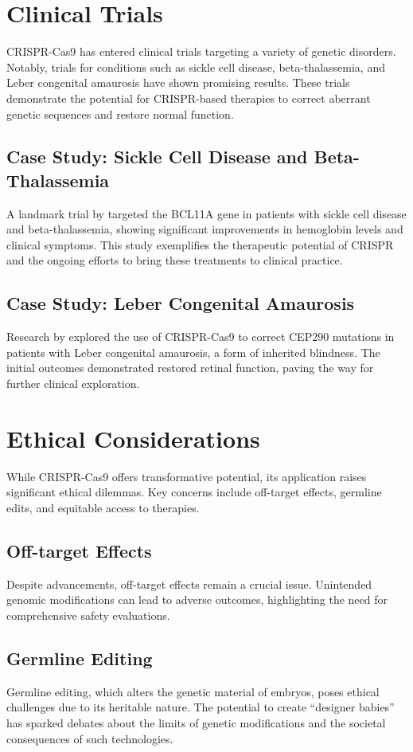 \documentclass[12pt]{article}
\begin{document}
\section{Clinical Trials}
CRISPR-Cas9 has entered clinical trials targeting a variety of genetic disorders. Notably, trials for conditions such as sickle cell disease, beta-thalassemia, and Leber congenital amaurosis have shown promising results. These trials demonstrate the potential for CRISPR-based therapies to correct aberrant genetic sequences and restore normal function.

\subsection{Case Study: Sickle Cell Disease and Beta-Thalassemia}
A landmark trial by \cite{frangoul2021} targeted the BCL11A gene in patients with sickle cell disease and beta-thalassemia, showing significant improvements in hemoglobin levels and clinical symptoms. This study exemplifies the therapeutic potential of CRISPR and the ongoing efforts to bring these treatments to clinical practice.

\subsection{Case Study: Leber Congenital Amaurosis}
Research by \cite{editas2021} explored the use of CRISPR-Cas9 to correct CEP290 mutations in patients with Leber congenital amaurosis, a form of inherited blindness. The initial outcomes demonstrated restored retinal function, paving the way for further clinical exploration.

\section{Ethical Considerations}
While CRISPR-Cas9 offers transformative potential, its application raises significant ethical dilemmas. Key concerns include off-target effects, germline edits, and equitable access to therapies.

\subsection{Off-target Effects}
Despite advancements, off-target effects remain a crucial issue. Unintended genomic modifications can lead to adverse outcomes, highlighting the need for comprehensive safety evaluations.

\subsection{Germline Editing}
Germline editing, which alters the genetic material of embryos, poses ethical challenges due to its heritable nature. The potential to create “designer babies” has sparked debates about the limits of genetic modifications and the societal consequences of such technologies.
\end{document}
